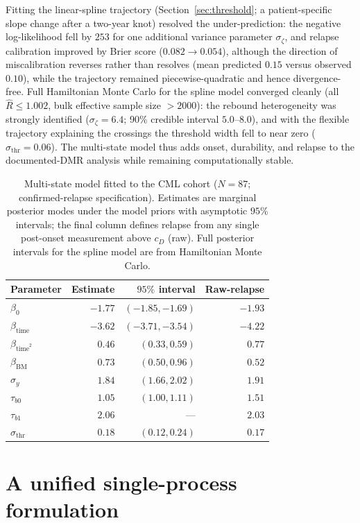 \documentclass[11pt]{article}
\begin{document}
Fitting the linear-spline trajectory (Section~\ref{sec:threshold}; a
patient-specific slope change after a two-year knot) resolved the
under-prediction: the negative log-likelihood fell by $253$ for one additional
variance parameter $\sigma_\zeta$, and relapse calibration improved by Brier
score ($0.082\to0.054$), although the direction of miscalibration reverses
rather than resolves (mean predicted $0.15$ versus observed $0.10$),
while the trajectory remained piecewise-quadratic and hence divergence-free.
Full Hamiltonian Monte Carlo for the spline model converged cleanly (all
$\widehat R\le1.002$, bulk effective sample size $>2000$): the rebound
heterogeneity was strongly identified ($\sigma_\zeta=6.4$; 90\% credible
interval $5.0$--$8.0$), and with the flexible trajectory explaining the
crossings the threshold width fell to near zero ($\sigma_{\mathrm{thr}}=0.06$).
The multi-state model thus adds onset, durability, and relapse to the
documented-DMR analysis while remaining computationally stable.

\begin{table}[!htbp]
\centering
\caption{Multi-state model fitted to the CML cohort ($N=87$; confirmed-relapse specification). Estimates are marginal posterior modes under the model priors with asymptotic $95\%$ intervals; the final column defines relapse from any single post-onset measurement above $c_D$ (raw). Full posterior intervals for the spline model are from Hamiltonian Monte Carlo.}
\label{tab:ms-real}
\small
\begin{tabular}{lrrr}
\toprule
Parameter & Estimate & $95\%$ interval & Raw-relapse\\
\midrule
$\beta_0$ & $-1.77$ & $(-1.85,-1.69)$ & $-1.93$\\
$\beta_{\mathrm{time}}$ & $-3.62$ & $(-3.71,-3.54)$ & $-4.22$\\
$\beta_{\mathrm{time}^2}$ & $0.46$ & $(0.33,0.59)$ & $0.77$\\
$\beta_{\mathrm{BM}}$ & $0.73$ & $(0.50,0.96)$ & $0.52$\\
$\sigma_y$ & $1.84$ & $(1.66,2.02)$ & $1.91$\\
$\tau_{b0}$ & $1.05$ & $(1.00,1.11)$ & $1.51$\\
$\tau_{b1}$ & $2.06$ & --- & $2.03$\\
$\sigma_{\mathrm{thr}}$ & $0.18$ & $(0.12,0.24)$ & $0.17$\\
\bottomrule
\end{tabular}
\end{table}

\section{A unified single-process formulation}
\label{sec:unified}
\end{document}
